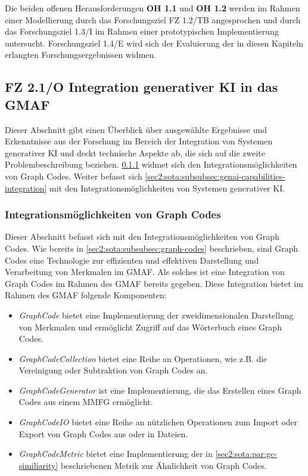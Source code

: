 Die beiden offenen Herausforderungen \textbf{OH 1.1} und \textbf{OH 1.2} werden im Rahmen einer Modellierung durch das Forschungsziel FZ 1.2/TB angesprochen und durch das Forschungsziel 1.3/I im Rahmen einer prototypischen Implementierung untersucht.
Forschungsziel 1.4/E wird sich der Evaluierung der in diesen Kapiteln erlangten Forschungsergebnissen widmen.

\clearpage

\subsection{FZ 2.1/O Integration generativer KI in das GMAF}
\label{sec2:sota:subsec:fz-integration}
Dieser Abschnitt gibt einen Überblick über ausgewählte Ergebnisse und Erkenntnisse aus der Forschung im Bereich der Integration von Systemen generativer KI und deckt technische Aspekte ab, die sich auf die zweite Problembeschreibung beziehen.
\cref{sec2:sota:subsubsec:gc-capabilities-integration} widmet sich den Integrationsmöglichkeiten von Graph Codes.
Weiter befasst sich \cref{sec2:sota:subsubsec:genai-capabilities-integration} mit den Integrationsmöglichkeiten von Systemen generativer KI.

\subsubsection{Integrationsmöglichkeiten von Graph Codes}
\label{sec2:sota:subsubsec:gc-capabilities-integration}
Dieser Abschnitt befasst sich mit den Integrationsmöglichkeiten von Graph Codes.
Wie bereits in \cref{sec2:sota:subsubsec:graph-codes} beschrieben, sind Graph Codes eine Technologie zur effizienten und effektiven Darstellung und Verarbeitung von Merkmalen im GMAF.
Als solches ist eine Integration von Graph Codes im Rahmen des GMAF bereits gegeben.
Diese Integration bietet im Rahmen des GMAF folgende Komponenten:
\begin{itemize}
    \item \textit{GraphCode} bietet eine Implementierung der zweidimensionalen Darstellung von Merkmalen und ermöglicht Zugriff auf das Wörterbuch eines Graph Codes.
    \item \textit{GraphCodeCollection} bietet eine Reihe an Operationen, wie z.B. die Vereinigung oder Subtraktion von Graph Codes an.
    \item \textit{GraphCodeGenerator} ist eine Implementierung, die das Erstellen eines Graph Codes aus einem MMFG ermöglicht.
    \item \textit{GraphCodeIO} bietet eine Reihe an nützlichen Operationen zum Import oder Export von Graph Codes aus oder in Dateien.
    \item \textit{GraphCodeMetric} bietet eine Implementierung der in \cref{sec2:sota:par:gc-similiarity} beschriebenen Metrik zur Ähnlichkeit von Graph Codes.
\end{itemize}

